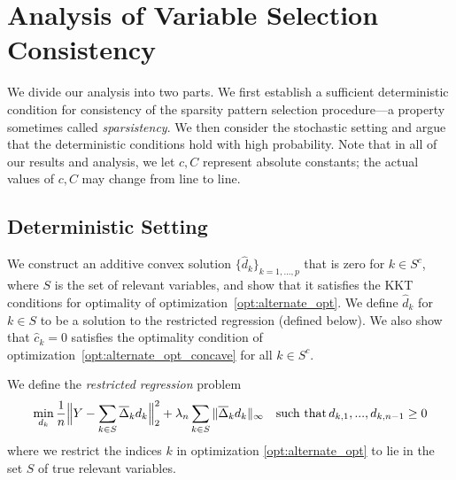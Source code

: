 \section{Analysis of Variable Selection Consistency}
\label{sec:finitesample}

We divide our analysis into two parts. We first establish a sufficient
deterministic condition for consistency of the sparsity pattern
selection procedure---a property sometimes called \textit{sparsistency}.
We then consider the
stochastic setting and argue that the deterministic conditions hold
with high probability. Note that in all of our results and analysis, we let $c,
C$ represent absolute constants; the actual values of $c,C$ may change from line to line.

\subsection{Deterministic Setting}

We construct an additive convex solution $\{\hat{d}_k\}_{k=1,...,p}$
that is zero for $k \in S^c$, where $S$ is the set of relevant
variables, and show that it satisfies the KKT
conditions for optimality of optimization~\eqref{opt:alternate_opt}. We
define $\hat{d}_k$ for $k \in S$ to be a solution to the restricted
regression (defined below). We also show that $\hat{c}_k =
0$ satisfies the optimality condition of
optimization~\eqref{opt:alternate_opt_concave} for all $k \in S^c$.

\begin{definition}
\label{def:restricted_regression}
We define the \emph{restricted regression} problem 
\[
\min_{d_k} \frac{1}{n} \Big\| Y - \sum_{k \in S} \overline{\Delta}_k d_k \Big\|_2^2 + 
   \lambda_n \sum_{k \in S} \| \overline{\Delta}_k d_k \|_\infty \quad \textrm{such that} \, d_{k,1}, ..., d_{k,n-1} \geq 0
\]
where we restrict the indices $k$ in
optimization \eqref{opt:alternate_opt} to lie in the set $S$ of true
relevant variables.
\end{definition}

